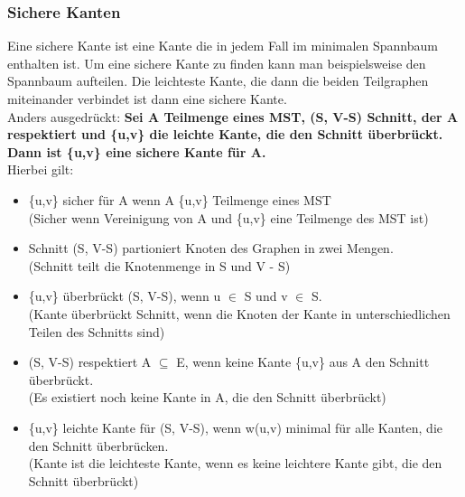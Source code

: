 \documentclass[
../../AuD-Zusammenfassung.tex,
]
{subfiles}
\begin{document}
\subsubsection*{Sichere Kanten}
Eine sichere Kante ist eine Kante die in jedem Fall im minimalen Spannbaum enthalten ist. Um eine sichere Kante zu finden kann man beispielsweise den Spannbaum aufteilen. Die leichteste Kante, die dann die beiden Teilgraphen miteinander verbindet ist dann eine sichere Kante.\\
Anders ausgedrückt: \textbf{Sei A Teilmenge eines MST, (S, V-S) Schnitt, der A respektiert und \{u,v\} die leichte Kante, die den Schnitt überbrückt. Dann ist \{u,v\} eine sichere Kante für A.} \\
Hierbei gilt:
\begin{itemize}
    \item \{u,v\} sicher für A wenn A \cup \{u,v\} Teilmenge eines MST \\
    (Sicher wenn Vereinigung von A und \{u,v\} eine Teilmenge des MST ist)
    \item Schnitt (S, V-S) partioniert Knoten des Graphen in zwei Mengen. \\
    (Schnitt teilt die Knotenmenge in S und V - S)
    \item \{u,v\} überbrückt (S, V-S), wenn u $\in$ S und v $\in$ S. \\
    (Kante überbrückt Schnitt, wenn die Knoten der Kante in unterschiedlichen Teilen des Schnitts sind)
    \item (S, V-S) respektiert A $\subseteq$ E, wenn keine Kante \{u,v\} aus A den Schnitt überbrückt. \\
    (Es existiert noch keine Kante in A, die den Schnitt überbrückt)
    \item \{u,v\} leichte Kante für (S, V-S), wenn w(u,v) minimal für alle Kanten, die den Schnitt überbrücken. \\
    (Kante ist die leichteste Kante, wenn es keine leichtere Kante gibt, die den Schnitt überbrückt)
\end{itemize}
\newpage
\end{document}
